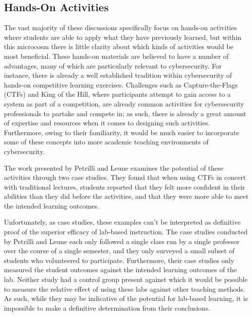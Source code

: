 \subsection{Hands-On Activities}

    The vast majority of these discussions specifically focus on hands-on activities where students are able to apply what they have previously learned, but within this microcosm there is little clarity about which kinds of activities would be most beneficial. These hands-on materials are believed to have a number of advantages, many of which are particularly relevant to cybersecurity. For instance, there is already a well established tradition within cybersecurity of hands-on competitive learning exercises. Challenges such as Capture-the-Flags (CTFs) and King of the Hill, where participants attempt to gain access to a system as part of a competition, are already common activities for cybersecurity professionals to partake and compete in; as such, there is already a great amount of expertise and resources when it comes to designing such activities. Furthermore, owing to their familiarity, it would be much easier to incorporate some of these concepts into more academic teaching environments of cybersecurity.

    The work presented by Petrilli and Leune examines the potential of these activities through two case studies. They found that when using CTFs in concert with traditional lectures, students reported that they felt more confident in their abilities than they did before the activities, and that they were more able to meet the intended learning outcomes. 

    Unfortunately, as case studies, these examples can't be interpreted as definitive proof of the superior efficacy of lab-based instruction. The case studies conducted by Petrilli and Leune each only followed a single class run by a single professor over the course of a single semester, and they only surveyed a small subset of students who volunteered to participate. 
    Furthermore, their case studies only measured the student outcomes against the intended learning outcomes of the lab. Neither study had a control group present against which it would be possible to measure the relative effect of using these labs against other teaching methods. As such, while they may be indicative of the potential for lab-based learning, it is impossible to make a definitive determination from their conclusions.

